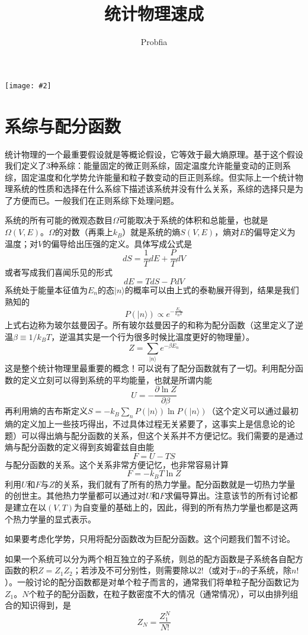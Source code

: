 \documentclass[a4paper,11pt]{ctexart}
\title{统计物理速成}
\author{Probfia}
\date{}
\newcommand{\beq}{\begin{equation}}
\newcommand{\eeq}{\end{equation}}
\newcommand{\cpic}[2]{
\begin{center}
\texttt{[image: \#2]}
\end{center}
}
\begin{document}
\begin{titlepage}
\maketitle
\cpic{0.07}{hotpot}
\end{titlepage}
\tableofcontents

\section{系综与配分函数}
统计物理的一个最重要假设就是等概论假设，它等效于最大熵原理。基于这个假设我们定义了3种系综：能量固定的微正则系综，固定温度允许能量变动的正则系综，固定温度和化学势允许能量和粒子数变动的巨正则系综。但实际上一个统计物理系统的性质和选择在什么系综下描述该系统并没有什么关系，系综的选择只是为了方便而已。一般我们在正则系综下处理问题。
\par
系统的所有可能的微观态数目$\varOmega$可能取决于系统的体积和总能量，也就是$\varOmega(V,E)$。$\varOmega$的对数（再乘上$k_B$）就是系统的熵$S(V,E)$，熵对$E$的偏导定义为温度；对$V$的偏导给出压强的定义。具体写成公式是
\beq
dS = \frac{1}{T}dE + \frac{P}{T} dV
\eeq
或者写成我们喜闻乐见的形式
\beq
dE = TdS - PdV
\eeq
系统处于能量本征值为$E_n$的态$|n\rangle$的概率可以由上式的泰勒展开得到，结果是我们熟知的
\beq
P(|n\rangle) \propto e^{-\frac{E_n}{k_B T}}
\eeq
上式右边称为玻尔兹曼因子。所有玻尔兹曼因子的和称为配分函数（这里定义了逆温$\beta \equiv 1/k_B T$，逆温其实是一个行为很多时候比温度更好的物理量）。
\beq
Z = \sum_{|n\rangle} e^{-\beta E_n}
\eeq
这是整个统计物理里最重要的概念！可以说有了配分函数就有了一切。利用配分函数的定义立刻可以得到系统的平均能量，也就是所谓内能
\beq
U = - \frac{\partial \ln Z}{\partial \beta}
\eeq
再利用熵的吉布斯定义$S = - k_B \sum_n P(|n\rangle) \ln P(|n\rangle)$（这个定义可以通过最初熵的定义加上一些技巧得出，不过具体过程无关紧要了，这事实上是信息论的论题）可以得出熵与配分函数的关系，但这个关系并不方便记忆。我们需要的是通过熵与配分函数的定义得到亥姆霍兹自由能
\beq
F = U - TS
\eeq
与配分函数的关系。这个关系非常方便记忆，也非常容易计算
\beq
F= - k_B T \ln Z
\eeq
利用$U$和$F$与$Z$的关系，我们就有了所有的热力学量。{\color{red}配分函数就是一切热力学量的创世主}。其他热力学量都可以通过对$U$和$F$求偏导算出。注意该节的所有讨论都是建立在以$(V,T)$为自变量的基础上的，因此，得到的所有热力学量也都是这两个热力学量的显式表示。
\par
如果要考虑化学势，只用将配分函数改为巨配分函数。这个问题我们暂不讨论。
\par
如果一个系统可以分为两个相互独立的子系统，则总的配方函数是子系统各自配方函数的积$Z = Z_1 Z_2$；若涉及不可分别性，则需要除以$2!$（或对于$n$的子系统，除$n!$）。一般讨论的配分函数都是对单个粒子而言的，通常我们将单粒子配分函数记为$Z_1$。$N$个粒子的配分函数，在粒子数密度不大的情况（通常情况），可以由排列组合的知识得到，是
\beq
Z_N  =\frac{Z_1^N}{N!}
\eeq
\end{document}
